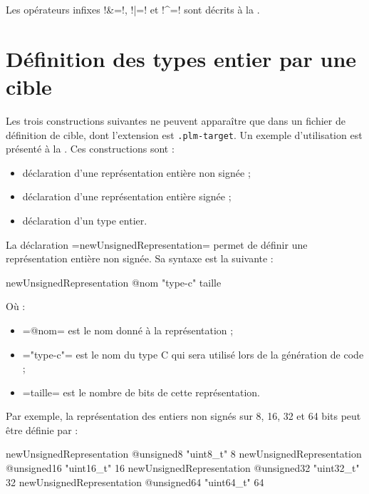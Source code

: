 Les opérateurs infixes \plm!&=!, \plm!|=! et \plm!^=! sont décrits à la .


\section{Définition des types entier par une cible}

Les trois constructions suivantes ne peuvent apparaître que dans un fichier de définition de cible, dont l'extension est \texttt{.plm-target}. Un exemple d'utilisation est présenté à la . Ces constructions sont :
\begin{itemize}
  \item déclaration d'une représentation entière non signée ;
  \item déclaration d'une représentation entière signée ;
  \item déclaration d'un type entier.
\end{itemize}



La déclaration \plm=newUnsignedRepresentation= permet de définir une représentation entière non signée. Sa syntaxe est la suivante :


\begin{PLM}
newUnsignedRepresentation @nom "type-c" taille
\end{PLM}

Où :
\begin{itemize}
  \item \plm=@nom= est le nom donné à la représentation ;
  \item \plm="type-c"= est le nom du type C qui sera utilisé lors de la génération de code ;
  \item \plm=taille= est le nombre de bits de cette représentation.
\end{itemize}

Par exemple, la représentation des entiers non signés sur 8, 16, 32 et 64 bits peut être définie par :
\begin{PLM}
newUnsignedRepresentation @unsigned8  "uint8_t"   8
newUnsignedRepresentation @unsigned16 "uint16_t" 16
newUnsignedRepresentation @unsigned32 "uint32_t" 32
newUnsignedRepresentation @unsigned64 "uint64_t" 64
\end{PLM}








